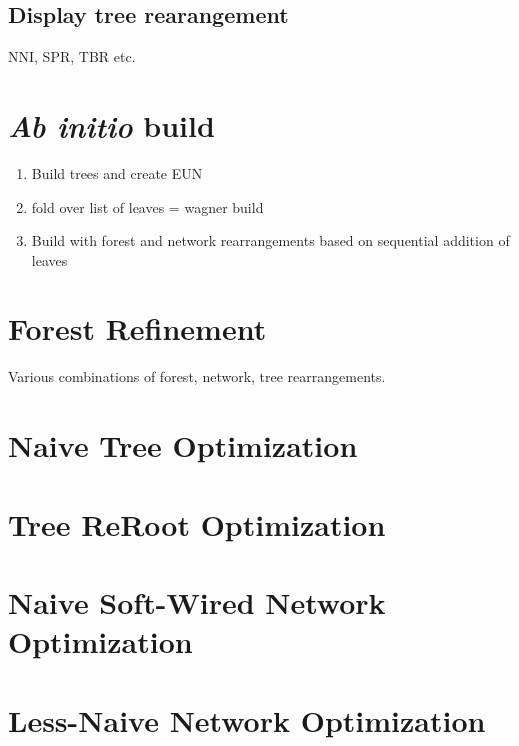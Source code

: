 \documentclass[11pt]{article}
\begin{document}
\subsection{Display tree rearangement}\label{Display tree rearangement}
NNI, SPR, TBR etc.
 
 \section{\textit{Ab initio} build}
 	\begin{enumerate}
		\item{Build trees and create EUN}
		\item{fold over list of leaves = wagner build}
		\item{Build with forest and network rearrangements based on sequential addition of leaves}
	\end{enumerate}
	
\section{Forest Refinement}\label{Forest Refinement}
Various combinations of forest, network, tree rearrangements.

 \section{Naive Tree Optimization}\label{Naive Tree Optimization}
 
 \section{Tree ReRoot Optimization}\label{Tree ReRoot Optimization}
 
 \section{Naive Soft-Wired Network Optimization}\label{Naive Soft-Wired Network Optimization}
 
 \section{Less-Naive Network Optimization} \label{Less-Naive Network Optimization}
 
\end{document}
